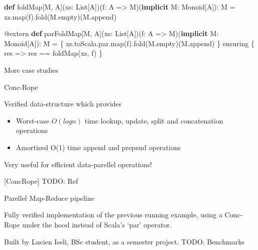 \documentclass[
  ignorenonframetext,
]{beamer}
\newenvironment{Shaded}{}{}
\newcommand{\FunctionTok}[1]{\textcolor[rgb]{0.02,0.16,0.49}{#1}}
\newcommand{\KeywordTok}[1]{\textcolor[rgb]{0.00,0.44,0.13}{\textbf{#1}}}
\newcommand{\NormalTok}[1]{#1}
\providecommand{\tightlist}{%
  \setlength{\itemsep}{0pt}\setlength{\parskip}{0pt}}
\begin{document}
\begin{frame}[fragile]

\begin{Shaded}
\begin{Highlighting}[]
\KeywordTok{def}\NormalTok{ foldMap[M, A](xs: List[A])(f: A => M)(}\KeywordTok{implicit}\NormalTok{ M: Monoid[A]): M =}
\NormalTok{  xs.}\FunctionTok{map}\NormalTok{(f).}\FunctionTok{fold}\NormalTok{(M.}\FunctionTok{empty}\NormalTok{)(M.}\FunctionTok{append}\NormalTok{)}

\NormalTok{@extern}
\KeywordTok{def}\NormalTok{ parFoldMap[M, A](xs: List[A])(f: A => M)(}\KeywordTok{implicit}\NormalTok{ M: Monoid[A]): M = \{}
\NormalTok{  xs.}\FunctionTok{toScala}\NormalTok{.}\FunctionTok{par}\NormalTok{.}\FunctionTok{map}\NormalTok{(f).}\FunctionTok{fold}\NormalTok{(M.}\FunctionTok{empty}\NormalTok{)(M.}\FunctionTok{append}\NormalTok{)}
\NormalTok{\} ensuring \{ res =>}
\NormalTok{  res == }\FunctionTok{foldMap}\NormalTok{(xs, f)}
\NormalTok{\}}
\end{Highlighting}
\end{Shaded}

\end{frame}

\begin{frame}{More case studies}
\protect\hypertarget{more-case-studies}{}

\end{frame}

\begin{frame}{Conc-Rope}
\protect\hypertarget{conc-rope}{}

Verified data-structure which provides

\begin{itemize}
\tightlist
\item
  Worst-case \(O(log n)\) time lookup, update, split and concatenation
  operations
\item
  Amortized O(1) time append and prepend operations
\end{itemize}

Very useful for efficient data-parellel operations!

{[}ConcRope{]} TODO: Ref

\end{frame}

\begin{frame}{Parellel Map-Reduce pipeline}
\protect\hypertarget{parellel-map-reduce-pipeline}{}

Fully verified implementation of the previous running example, using a
Conc-Rope under the hood instead of Scala's `par' operator.

Built by Lucien Iseli, BSc student, as a semester project. TODO:
Benchmarks

\end{frame}
\end{document}
